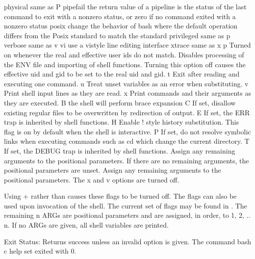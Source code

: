 \documentclass[letterpaper,12pt,english]{sphinxmanual}
\begin{document}
\begin{sphinxVerbatim}[commandchars=\\\{\}]
              physical     same as \PYGZhy{}P
              pipefail     the return value of a pipeline is the status of
                           the last command to exit with a non\PYGZhy{}zero status,
                           or zero if no command exited with a non\PYGZhy{}zero status
              posix        change the behavior of bash where the default
                           operation differs from the Posix standard to
                           match the standard
              privileged   same as \PYGZhy{}p
              verbose      same as \PYGZhy{}v
              vi           use a vi\PYGZhy{}style line editing interface
              xtrace       same as \PYGZhy{}x
      \PYGZhy{}p  Turned on whenever the real and effective user ids do not match.
          Disables processing of the \PYGZdl{}ENV file and importing of shell
          functions.  Turning this option off causes the effective uid and
          gid to be set to the real uid and gid.
      \PYGZhy{}t  Exit after reading and executing one command.
      \PYGZhy{}u  Treat unset variables as an error when substituting.
      \PYGZhy{}v  Print shell input lines as they are read.
      \PYGZhy{}x  Print commands and their arguments as they are executed.
      \PYGZhy{}B  the shell will perform brace expansion
      \PYGZhy{}C  If set, disallow existing regular files to be overwritten
          by redirection of output.
      \PYGZhy{}E  If set, the ERR trap is inherited by shell functions.
      \PYGZhy{}H  Enable ! style history substitution.  This flag is on
          by default when the shell is interactive.
      \PYGZhy{}P  If set, do not resolve symbolic links when executing commands
          such as cd which change the current directory.
      \PYGZhy{}T  If set, the DEBUG trap is inherited by shell functions.
      \PYGZhy{}\PYGZhy{}  Assign any remaining arguments to the positional parameters.
          If there are no remaining arguments, the positional parameters
          are unset.
      \PYGZhy{}   Assign any remaining arguments to the positional parameters.
          The \PYGZhy{}x and \PYGZhy{}v options are turned off.

    Using + rather than \PYGZhy{} causes these flags to be turned off.  The
    flags can also be used upon invocation of the shell.  The current
    set of flags may be found in \PYGZdl{}\PYGZhy{}.  The remaining n ARGs are positional
    parameters and are assigned, in order, to \PYGZdl{}1, \PYGZdl{}2, .. \PYGZdl{}n.  If no
    ARGs are given, all shell variables are printed.

    Exit Status:
    Returns success unless an invalid option is given.
The command \PYGZdq{}bash \PYGZhy{}c \PYGZdq{}help set\PYGZdq{}\PYGZdq{} exited with 0.
\end{sphinxVerbatim}
\end{document}
